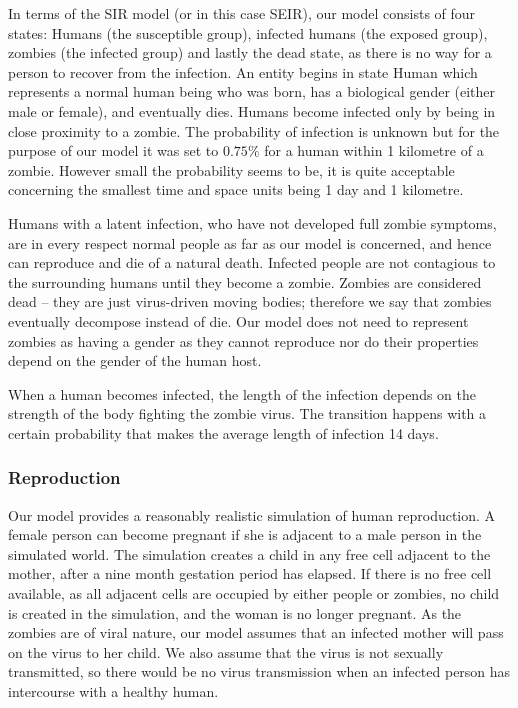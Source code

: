 \documentclass[a4paper]{article}
\begin{document}
In terms of the SIR model (or in this case SEIR), our model consists of four states: Humans (the susceptible group), infected humans (the exposed group), zombies (the infected group) and lastly the dead state, as there is no way for a person to recover from the infection.
An entity begins in state Human which represents a normal human being who was born, has a biological gender (either male or female), and eventually dies.
Humans become infected only by being in close proximity to a zombie.
The probability of infection is unknown but for the purpose of our model it was set to $0.75\%$ for a human within 1 kilometre of a zombie.
However small the probability seems to be, it is quite acceptable concerning the smallest time and space units being 1 day and 1 kilometre.

Humans with a latent infection, who have not developed full zombie symptoms, are in every respect normal people as far as our model is concerned, and hence can reproduce and die of a natural death.
Infected people are not contagious to the surrounding humans until they become a zombie.
Zombies are considered dead -- they are just virus-driven moving bodies; therefore we say that zombies eventually decompose instead of die.
Our model does not need to represent zombies as having a gender as they cannot reproduce nor do their properties depend on the gender of the human host.

When a human becomes infected, the length of the infection depends on the strength of the body fighting the zombie virus.
The transition happens with a certain probability that makes the average length of infection 14 days.

\subsubsection{Reproduction}

Our model provides a reasonably realistic simulation of human reproduction.
A female person can become pregnant if she is adjacent to a male person in the simulated world.
The simulation creates a child in any free cell adjacent to the mother, after a nine month gestation period has elapsed\cite{pregnancy}.
If there is no free cell available, as all adjacent cells are occupied by either people or zombies, no child is created in the simulation, and the woman is no longer pregnant.
As the zombies are of viral nature, our model assumes that an infected mother will pass on the virus to her child.
We also assume that the virus is not sexually transmitted, so there would be no virus transmission when an infected person has intercourse with a healthy human.
\end{document}
